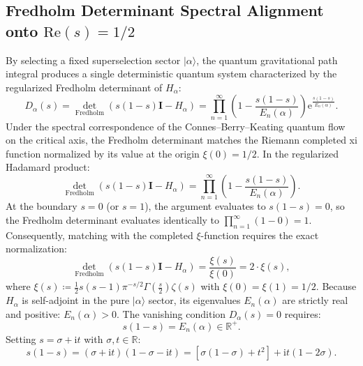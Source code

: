 \documentclass[11pt,a4paper,reqno]{article}
\theoremstyle{plain}
\theoremstyle{definition}
\theoremstyle{remark}
\numberwithin{equation}{section}
\newcommand{\R}{\mathbb{R}}
\begin{document}
\subsection{Fredholm Determinant Spectral Alignment onto \texorpdfstring{$\mathrm{Re}(s) = 1/2$}{Re(s) = 1/2}}
By selecting a fixed superselection sector $|\alpha\rangle$, the quantum gravitational path integral produces a single deterministic quantum system characterized by the regularized Fredholm determinant of $H_\alpha$:
\begin{equation}
  D_\alpha(s) = {\det}_{\mathrm{Fredholm}}\left( s(1-s) \mathbf{I} - H_\alpha \right) = \prod_{n=1}^\infty \left( 1 - \frac{s(1-s)}{E_n(\alpha)} \right) \mathrm{e}^{\frac{s(1-s)}{E_n(\alpha)}}.
  \label{eq:fredholm_determinant}
\end{equation}
Under the spectral correspondence of the Connes--Berry--Keating quantum flow on the critical axis, the Fredholm determinant matches the Riemann completed xi function normalized by its value at the origin $\xi(0) = 1/2$. In the regularized Hadamard product:
\begin{equation}
  {\det}_{\mathrm{Fredholm}}\left( s(1-s) \mathbf{I} - H_\alpha \right) = \prod_{n=1}^\infty \left( 1 - \frac{s(1-s)}{E_n(\alpha)} \right).
\end{equation}
At the boundary $s = 0$ (or $s = 1$), the argument evaluates to $s(1-s) = 0$, so the Fredholm determinant evaluates identically to $\prod_{n=1}^\infty (1 - 0) = 1$. Consequently, matching with the completed $\xi$-function requires the exact normalization:
\begin{equation}
  {\det}_{\mathrm{Fredholm}}\left( s(1-s) \mathbf{I} - H_\alpha \right) = \frac{\xi(s)}{\xi(0)} = 2 \cdot \xi(s),
  \label{eq:xi_matching}
\end{equation}
where $\xi(s) \coloneqq \frac{1}{2} s(s-1) \pi^{-s/2} \Gamma\left(\frac{s}{2}\right) \zeta(s)$ with $\xi(0) = \xi(1) = 1/2$.
Because $H_\alpha$ is self-adjoint in the pure $|\alpha\rangle$ sector, its eigenvalues $E_n(\alpha)$ are strictly real and positive: $E_n(\alpha) > 0$. The vanishing condition $D_\alpha(s) = 0$ requires:
\begin{equation}
  s(1 - s) = E_n(\alpha) \in \R^+.
  \label{eq:critical_axis_derivation}
\end{equation}
Setting $s = \sigma + \mathrm{i}t$ with $\sigma, t \in \R$:
\begin{equation}
  s(1 - s) = (\sigma + \mathrm{i}t)(1 - \sigma - \mathrm{i}t) = \left[ \sigma(1 - \sigma) + t^2 \right] + \mathrm{i} t (1 - 2\sigma).
  \label{eq:complex_s_expansion}
\end{equation}
\end{document}
